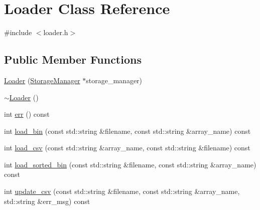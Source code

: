 \hypertarget{classLoader}{}\section{Loader Class Reference}
\label{classLoader}


{\ttfamily \#include $<$loader.\+h$>$}

\subsection*{Public Member Functions}
\begin{DoxyCompactItemize}
\item 
\hyperlink{classLoader_aac50fd71320fd5bb76ea5c0ce74a3197}{Loader} (\hyperlink{classStorageManager}{Storage\+Manager} $\ast$storage\+\_\+manager)
\item 
\hyperlink{classLoader_a254054e8c7c1e17b8c422716d273914d}{$\sim$\+Loader} ()
\item 
int \hyperlink{classLoader_a644fc739f312738afe2fc93f4f712ca4}{err} () const 
\item 
int \hyperlink{classLoader_a3b8dcc3f41df467f728c78b358be29b6}{load\+\_\+bin} (const std\+::string \&filename, const std\+::string \&array\+\_\+name) const 
\item 
int \hyperlink{classLoader_a1c9d786adc04d507e00ace82f9b29319}{load\+\_\+csv} (const std\+::string \&array\+\_\+name, const std\+::string \&filename) const 
\item 
int \hyperlink{classLoader_a638cdb46ebae88bbbbe7aa4526e4d00f}{load\+\_\+sorted\+\_\+bin} (const std\+::string \&filename, const std\+::string \&array\+\_\+name) const 
\item 
int \hyperlink{classLoader_afcc5573de0149cda70c9a6a06e562559}{update\+\_\+csv} (const std\+::string \&filename, const std\+::string \&array\+\_\+name, std\+::string \&err\+\_\+msg) const 
\end{DoxyCompactItemize}
